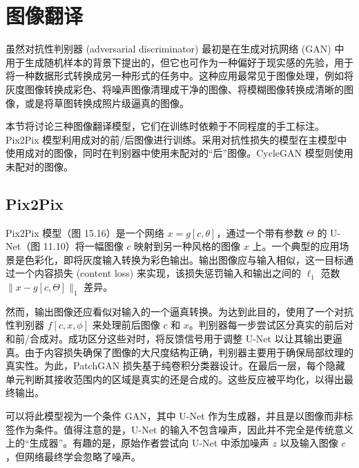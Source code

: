 \documentclass[lang=cn,newtx,10pt,scheme=chinese]{elegantbook}
\begin{document}
\section{图像翻译}
虽然对抗性判别器 (adversarial discriminator) 最初是在生成对抗网络 (GAN) 中用于生成随机样本的背景下提出的，但它也可作为一种偏好于现实感的先验，用于将一种数据形式转换成另一种形式的任务中。这种应用最常见于图像处理，例如将灰度图像转换成彩色、将噪声图像清理成干净的图像、将模糊图像转换成清晰的图像，或是将草图转换成照片级逼真的图像。

本节将讨论三种图像翻译模型，它们在训练时依赖于不同程度的手工标注。Pix2Pix 模型利用成对的前/后图像进行训练。采用对抗性损失的模型在主模型中使用成对的图像，同时在判别器中使用未配对的“后”图像。CycleGAN 模型则使用未配对的图像。

\subsection{Pix2Pix}
Pix2Pix 模型（图 15.16）是一个网络 \(x = g[c, \theta]\)，通过一个带有参数 \(\Theta\) 的 U-Net（图 11.10）将一幅图像 \(c\) 映射到另一种风格的图像 \(x\) 上。一个典型的应用场景是色彩化，即将灰度输入转换为彩色输出。输出图像应与输入相似，这一目标通过一个内容损失 (content loss) 来实现，该损失惩罚输入和输出之间的 \(\ell_1\) 范数 \(\|x - g[c, \Theta]\|_1\) 差异。

然而，输出图像还应看似对输入的一个逼真转换。为达到此目的，使用了一个对抗性判别器 \(f[c, x, \phi]\) 来处理前后图像 \(c\) 和 \(x\)。判别器每一步尝试区分真实的前后对和前/合成对。成功区分这些对时，将反馈信号用于调整 U-Net 以让其输出更逼真。由于内容损失确保了图像的大尺度结构正确，判别器主要用于确保局部纹理的真实性。为此，PatchGAN 损失基于纯卷积分类器设计。在最后一层，每个隐藏单元判断其接收范围内的区域是真实的还是合成的。这些反应被平均化，以得出最终输出。

可以将此模型视为一个条件 GAN，其中 U-Net 作为生成器，并且是以图像而非标签作为条件。值得注意的是，U-Net 的输入不包含噪声，因此并不完全是传统意义上的“生成器”。有趣的是，原始作者尝试向 U-Net 中添加噪声 \(z\) 以及输入图像 \(c\)，但网络最终学会忽略了噪声。
\end{document}
